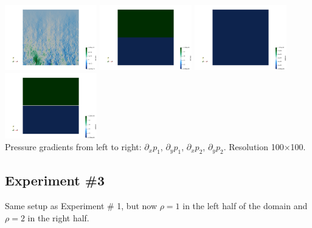 \begin{center}
\includegraphics[width=4cm]{python_codes/fieldstone_119/results/exp2/dp1dx}
\includegraphics[width=4cm]{python_codes/fieldstone_119/results/exp2/dp1dy}
\includegraphics[width=4cm]{python_codes/fieldstone_119/results/exp2/dp2dx}
\includegraphics[width=4cm]{python_codes/fieldstone_119/results/exp2/dp2dy}\\
{\captionfont 
Pressure gradients from left to right: $\partial_xp_1$, $\partial_yp_1$, $\partial_xp_2$, $\partial_yp_2$. 
Resolution 100$\times$100.}
\end{center}

\newpage
\subsection*{Experiment \#3}

Same setup as Experiment \# 1, but now $\rho=1$ in the left half of the domain and $\rho=2$ in the right half.

